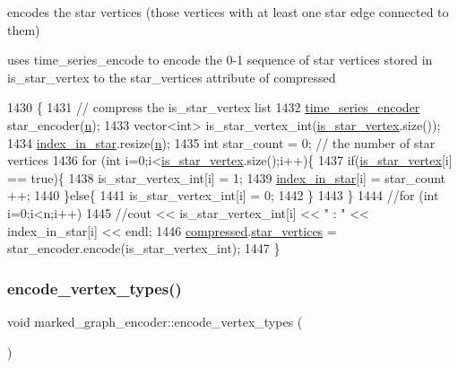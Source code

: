 encodes the star vertices (those vertices with at least one star edge connected to them) 

uses time\+\_\+series\+\_\+encode to encode the 0-\/1 sequence of star vertices stored in is\+\_\+star\+\_\+vertex to the star\+\_\+vertices attribute of compressed 
\begin{DoxyCode}
1430 \{
1431   \textcolor{comment}{// compress the is\_star\_vertex list}
1432   \hyperlink{classtime__series__encoder}{time\_series\_encoder} star\_encoder(\hyperlink{classmarked__graph__encoder_a4c66d9fdbc14c97523715aac7e4511cb}{n});
1433   vector<int> is\_star\_vertex\_int(\hyperlink{classmarked__graph__encoder_ac36f6c2430af6fa4d20584569859bb59}{is\_star\_vertex}.size());
1434   \hyperlink{classmarked__graph__encoder_ac3cc1cb565e72a53d35360891f990aa9}{index\_in\_star}.resize(\hyperlink{classmarked__graph__encoder_a4c66d9fdbc14c97523715aac7e4511cb}{n});
1435   \textcolor{keywordtype}{int} star\_count = 0; \textcolor{comment}{// the number of star vertices }
1436   \textcolor{keywordflow}{for} (\textcolor{keywordtype}{int} i=0;i<\hyperlink{classmarked__graph__encoder_ac36f6c2430af6fa4d20584569859bb59}{is\_star\_vertex}.size();i++)\{
1437     \textcolor{keywordflow}{if}(\hyperlink{classmarked__graph__encoder_ac36f6c2430af6fa4d20584569859bb59}{is\_star\_vertex}[i] == \textcolor{keyword}{true})\{
1438       is\_star\_vertex\_int[i] = 1;
1439       \hyperlink{classmarked__graph__encoder_ac3cc1cb565e72a53d35360891f990aa9}{index\_in\_star}[i] = star\_count ++;
1440     \}\textcolor{keywordflow}{else}\{
1441       is\_star\_vertex\_int[i] = 0;
1442     \}
1443   \}
1444   \textcolor{comment}{//for (int i=0;i<n;i++)}
1445   \textcolor{comment}{//cout << is\_star\_vertex\_int[i] << " : " << index\_in\_star[i] << endl;}
1446   \hyperlink{classmarked__graph__encoder_ac2ded200860fdd2321f86dd76b28bcb3}{compressed}.\hyperlink{classmarked__graph__compressed_a7a4ced4586e2e353f9076bd447df5208}{star\_vertices} = star\_encoder.encode(is\_star\_vertex\_int);
1447 \}
\end{DoxyCode}
\mbox{\label{classmarked__graph__encoder_a239769085214166e09cb56de750a8d71}} 
\subsubsection{\texorpdfstring{encode\+\_\+vertex\+\_\+types()}{encode\_vertex\_types()}}
{\footnotesize\ttfamily void marked\+\_\+graph\+\_\+encoder\+::encode\+\_\+vertex\+\_\+types (\begin{DoxyParamCaption}{ }\end{DoxyParamCaption})\hspace{0.3cm}{\ttfamily [private]}}



